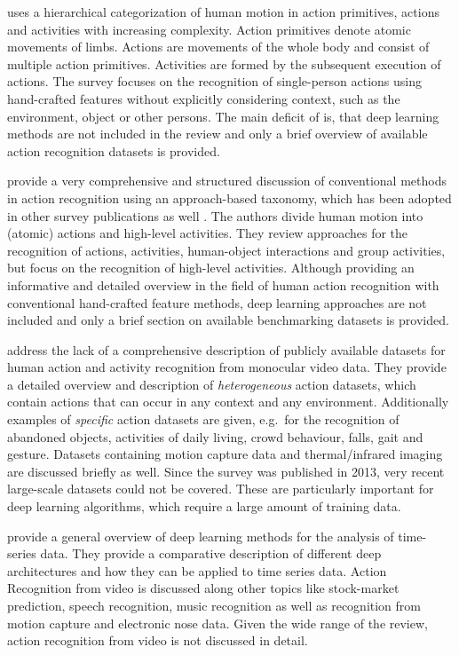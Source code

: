 \textcite{poppe_survey_2010} uses a hierarchical categorization of human motion in action primitives, actions and activities with increasing complexity.
Action primitives denote atomic movements of limbs.
Actions are movements of the whole body and consist of multiple action primitives.
Activities are formed by the subsequent execution of actions.
The survey focuses on the recognition of single-person actions using hand-crafted features without explicitly considering context, such as the environment, object or other persons. 
The main deficit of \cite{poppe_survey_2010} is, that deep learning methods are not included in the review and only a brief overview of available action recognition datasets is provided.

\textcite{aggarwal_human_2011} provide a very comprehensive and structured discussion of conventional methods in action recognition using an approach-based taxonomy, which has been adopted in other survey publications as well \cite{cheng_advances_2015}.
The authors divide human motion into (atomic) actions and high-level activities.
They review approaches for the recognition of actions, activities, human-object interactions and group activities, but focus on the recognition of high-level activities.
Although providing an informative and detailed overview in the field of human action recognition with conventional hand-crafted feature methods, deep learning approaches are not included and only a brief section on available benchmarking datasets is provided.

\textcite{chaquet_survey_2013} address the lack of a comprehensive description of publicly available datasets for human action and activity recognition from monocular video data.
They provide a detailed overview and description of \textit{heterogeneous} action datasets, which contain actions that can occur in any context and any environment.
Additionally examples of \textit{specific} action datasets are given, e.g.\ for the recognition of abandoned objects, activities of daily living, crowd behaviour, falls, gait and gesture.
Datasets containing motion capture data and thermal/infrared imaging are discussed briefly as well.
Since the survey was published in 2013, very recent large-scale datasets could not be covered.
These are particularly important for deep learning algorithms, which require a large amount of training data.

\textcite{langkvist_review_2014} provide a general overview of deep learning methods for the analysis of time-series data.
They provide a comparative description of different deep architectures and how they can be applied to time series data.
Action Recognition from video is discussed along other topics like stock-market prediction, speech recognition, music recognition as well as recognition from motion capture and electronic nose data.
Given the wide range of the review, action recognition from video is not discussed in detail.

